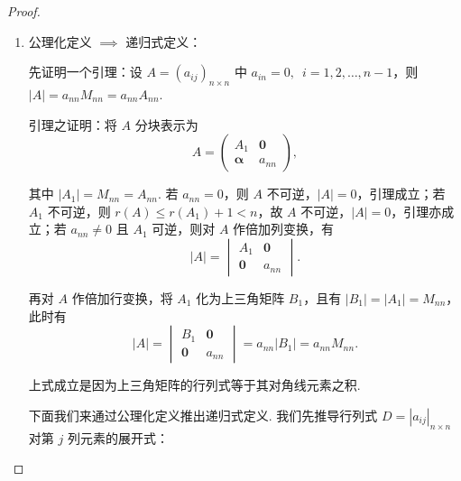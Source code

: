 \begin{proof}
    \begin{enumerate}
        \item 公理化定义 $\implies$ 递归式定义：

            先证明一个引理：设 $A=(a_{ij})_{n \times n}$ 中 $a_{in}=0,\enspace i = 1, 2, \ldots, n-1$，则 $|A| = a_{nn} M_{nn} = a_{nn} A_{nn}$.

            引理之证明：将 $A$ 分块表示为
            \[
                A = \begin{pmatrix}
                    A_1             & \mathbf{0} \\
                    \mathbf{\alpha} & a_{nn}
                \end{pmatrix},
            \]

            其中 $|A_1| = M_{nn} = A_{nn}$. 若 $a_{nn} = 0$，则 $A$ 不可逆，$|A| = 0$，引理成立；若 $A_1$ 不可逆，则 $r(A) \leqslant r(A_1) + 1 < n$，故 $A$ 不可逆，$|A| = 0$，引理亦成立；若 $a_{nn} \neq 0$ 且 $A_1$ 可逆，则对 $A$ 作倍加列变换，有
            \[
                |A| = \begin{vmatrix}
                    A_1             & \mathbf{0} \\
                    \mathbf{0}      & a_{nn}
                \end{vmatrix}.
            \]

            再对 $A$ 作倍加行变换，将 $A_1$ 化为上三角矩阵 $B_1$，且有 $|B_1| = |A_1| = M_{nn}$，此时有
            \[
                |A| = \begin{vmatrix}
                    B_1             & \mathbf{0} \\
                    \mathbf{0}      & a_{nn}
                \end{vmatrix} = a_{nn} |B_1| = a_{nn} M_{nn}.
            \]

            上式成立是因为上三角矩阵的行列式等于其对角线元素之积.

            下面我们来通过公理化定义推出递归式定义. 我们先推导行列式 $D=|a_{ij}|_{n \times n}$ 对第 $j$ 列元素的展开式：


\end{enumerate}
\end{proof}

